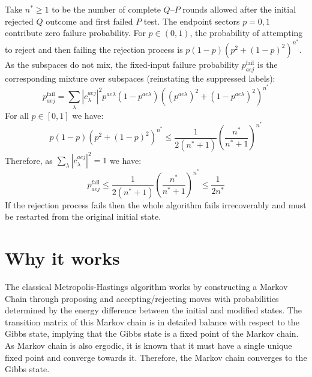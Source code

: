 \documentclass[aps,floatfix,10pt,amssymb,amsfont,amsmath,superscriptaddress,float,nofootinbib,longbibliography,nobalancelastpage,twocolumn]{revtex4-2}
\begin{document}
Take $n^*\geq1$ to be the number of complete $Q$--$P$ rounds allowed after the initial rejected $Q$ outcome and first failed $P$ test. The endpoint sectors $p=0,1$ contribute zero failure probability. For $p\in(0,1)$, the probability of attempting to reject and then failing the rejection process is $p(1-p)(p^2 +(1-p)^2)^{n^*}$. As the subspaces do not mix, the fixed-input failure probability $p_{aej}^{\mathrm{fail}}$ is the corresponding mixture over subspaces (reinstating the suppressed labels):
\begin{equation}
   p_{aej}^{\mathrm{fail}} =  \sum_{\lambda}|c^{aej}_{\lambda}|^2p^{ae\lambda}(1-p^{ae\lambda})((p^{ae\lambda})^2 +(1-p^{ae\lambda})^2)^{n^*}
\end{equation}
For all $p \in [0,1]$ we have: 
\begin{equation}
    p(1-p)(p^2 +(1-p)^2)^{n^*} \leq \frac{1}{2(n^*+1)} \left(\frac{n^*}{n^*+1}\right)^{n^*}
\end{equation}
Therefore, as $\sum_{\lambda}|c^{aej}_{\lambda}|^2=1$ we have:
\begin{equation}
    \label{eq:probabilty_of_rejection}
   p_{aej}^{\mathrm{fail}} \leq \frac{1}{2(n^*+1)} \left(\frac{n^*}{n^*+1}\right)^{n^*} \leq \frac{1}{2n^*}
\end{equation}
If the rejection process fails then the whole algorithm fails irrecoverably and must be restarted from the original initial state.

\label{section:rejection}

\section{Why it works}
\label{section:why}
The classical Metropolis-Hastings algorithm works by constructing a Markov Chain through proposing and accepting/rejecting moves with probabilities determined by the energy difference between the initial and modified states. The transition matrix of this Markov chain is in detailed balance with respect to the Gibbs state, implying that the Gibbs state is a fixed point of the Markov chain. As Markov chain is also ergodic, it is known that it must have a single unique fixed point and converge towards it. Therefore, the Markov chain converges to the Gibbs state.
\end{document}
